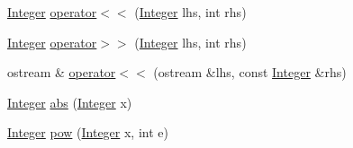 \begin{DoxyCompactItemize}
\item 
\hyperlink{classInteger}{Integer} \hyperlink{classInteger_aaf32bc4191034ed250a064aa6796ade5}{operator$<$$<$} (\hyperlink{classInteger}{Integer} lhs, int rhs)
\item 
\hyperlink{classInteger}{Integer} \hyperlink{classInteger_a06b0180ba9f20ffd4401155763a03119}{operator$>$$>$} (\hyperlink{classInteger}{Integer} lhs, int rhs)
\item 
ostream \& \hyperlink{classInteger_a365f9733a15ad556c4f43eeef5d6d542}{operator$<$$<$} (ostream \&lhs, const \hyperlink{classInteger}{Integer} \&rhs)
\item 
\hyperlink{classInteger}{Integer} \hyperlink{classInteger_ac872a9e1c5a2e8e1457baf75e439f8da}{abs} (\hyperlink{classInteger}{Integer} x)
\item 
\hyperlink{classInteger}{Integer} \hyperlink{classInteger_a952b384ed1bfaf53196af505c20ca8d8}{pow} (\hyperlink{classInteger}{Integer} x, int e)
\end{DoxyCompactItemize}


